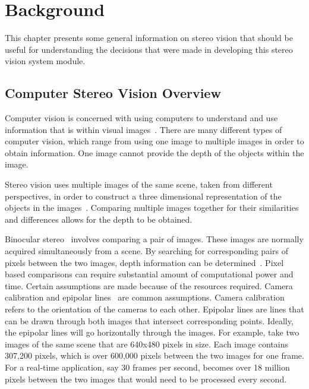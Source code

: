 \chapter{Background}
\label{bckgrnd}

This chapter presents some general information on stereo vision that should be useful for understanding the decisions that were made in developing this stereo vision system module.

\section{Computer Stereo Vision Overview}

Computer vision is concerned with using computers to understand and use information that is within visual images~\cite{computerVision}. There are many different types of computer vision, which range from using one image to multiple images in order to obtain information. One image cannot provide the depth of the objects within the image.

Stereo vision uses multiple images of the same scene, taken from different perspectives, in order to construct a three dimensional representation of the objects in the images~\cite{stereoVision}. Comparing multiple images together for their similarities and differences allows for the depth to be obtained.

Binocular stereo~\cite{binocularStereo} involves comparing a pair of images. These images are normally acquired simultaneously from a scene. By searching for corresponding pairs of pixels between the two images, depth information can be determined~\cite{binocularStereo}. Pixel based comparisons can require substantial amount of computational power and time. Certain assumptions are made because of the resources required. Camera calibration and epipolar lines~\cite{binocularStereo} are common assumptions. Camera calibration refers to the orientation of the cameras to each other. Epipolar lines are lines that can be drawn through both images that intersect corresponding points. Ideally, the epipolar lines will go horizontally through the images. For example, take two images of the same scene that are 640x480 pixels in size. Each image contains 307,200 pixels, which is over 600,000 pixels between the two images for one frame. For a real-time application, say 30 frames per second, becomes over 18 million pixels between the two images that would need to be processed every second.

